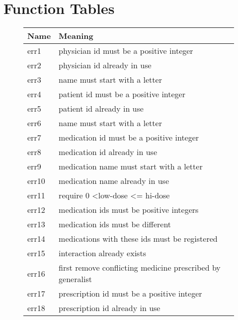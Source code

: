\section{Function Tables}

\begin{figure}[]
\begin{center}
\begin{tabular}{|l|l|}
\hline
Name  & Meaning                                                    \\ \hline
err1  & physician id must be a positive integer                    \\ \hline
err2  & physician id already in use                                \\ \hline
err3  & name must start with a letter                              \\ \hline
err4  & patient id must be a positive integer                      \\ \hline
err5  & patient id already in use                                  \\ \hline
err6  & name must start with a letter                              \\ \hline
err7  & medication id must be a positive integer                   \\ \hline
err8  & medication id already in use                               \\ \hline
err9  & medication name must start with a letter                   \\ \hline
err10 & medication name already in use                             \\ \hline
err11 & require 0 \textless low-dose \textless= hi-dose            \\ \hline
err12 & medication ids must be positive integers                   \\ \hline
err13 & medication ids must be different                           \\ \hline
err14 & medications with these ids must be registered              \\ \hline
err15 & interaction already exists                                 \\ \hline
err16 & first remove conflicting medicine prescribed by generalist \\ \hline
err17 & prescription id must be a positive integer                 \\ \hline
err18 & prescription id already in use                             \\ \hline

\end{tabular}
\end{center}
\end{figure}
